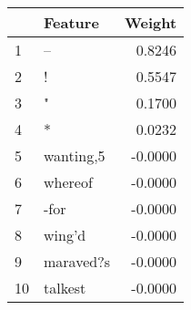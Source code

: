 \begin{tabular}{llr}
\toprule
{} &    Feature &  Weight \\
\midrule
1  &         -- &  0.8246 \\
2  &          ! &  0.5547 \\
3  &          " &  0.1700 \\
4  &          * &  0.0232 \\
5  &  wanting,5 & -0.0000 \\
6  &    whereof & -0.0000 \\
7  &       -for & -0.0000 \\
8  &     wing'd & -0.0000 \\
9  &  maraved?s & -0.0000 \\
10 &    talkest & -0.0000 \\
\bottomrule
\end{tabular}
